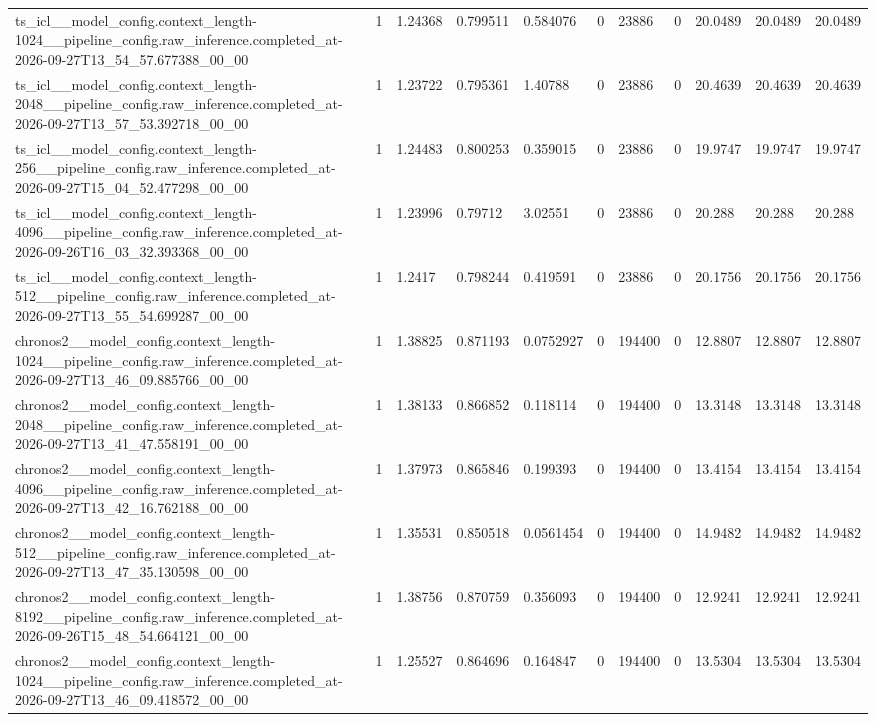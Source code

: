 \begin{tabular}{lllllllllll}
ts\_icl\_\_model\_config.context\_length-1024\_\_pipeline\_config.raw\_inference.completed\_at-2026-09-27T13\_54\_57.677388\_00\_00 & 1 & 1.24368 & 0.799511 & 0.584076 & 0 & 23886 & 0 & 20.0489 & 20.0489 & 20.0489 \\
ts\_icl\_\_model\_config.context\_length-2048\_\_pipeline\_config.raw\_inference.completed\_at-2026-09-27T13\_57\_53.392718\_00\_00 & 1 & 1.23722 & 0.795361 & 1.40788 & 0 & 23886 & 0 & 20.4639 & 20.4639 & 20.4639 \\
ts\_icl\_\_model\_config.context\_length-256\_\_pipeline\_config.raw\_inference.completed\_at-2026-09-27T15\_04\_52.477298\_00\_00 & 1 & 1.24483 & 0.800253 & 0.359015 & 0 & 23886 & 0 & 19.9747 & 19.9747 & 19.9747 \\
ts\_icl\_\_model\_config.context\_length-4096\_\_pipeline\_config.raw\_inference.completed\_at-2026-09-26T16\_03\_32.393368\_00\_00 & 1 & 1.23996 & 0.79712 & 3.02551 & 0 & 23886 & 0 & 20.288 & 20.288 & 20.288 \\
ts\_icl\_\_model\_config.context\_length-512\_\_pipeline\_config.raw\_inference.completed\_at-2026-09-27T13\_55\_54.699287\_00\_00 & 1 & 1.2417 & 0.798244 & 0.419591 & 0 & 23886 & 0 & 20.1756 & 20.1756 & 20.1756 \\
chronos2\_\_model\_config.context\_length-1024\_\_pipeline\_config.raw\_inference.completed\_at-2026-09-27T13\_46\_09.885766\_00\_00 & 1 & 1.38825 & 0.871193 & 0.0752927 & 0 & 194400 & 0 & 12.8807 & 12.8807 & 12.8807 \\
chronos2\_\_model\_config.context\_length-2048\_\_pipeline\_config.raw\_inference.completed\_at-2026-09-27T13\_41\_47.558191\_00\_00 & 1 & 1.38133 & 0.866852 & 0.118114 & 0 & 194400 & 0 & 13.3148 & 13.3148 & 13.3148 \\
chronos2\_\_model\_config.context\_length-4096\_\_pipeline\_config.raw\_inference.completed\_at-2026-09-27T13\_42\_16.762188\_00\_00 & 1 & 1.37973 & 0.865846 & 0.199393 & 0 & 194400 & 0 & 13.4154 & 13.4154 & 13.4154 \\
chronos2\_\_model\_config.context\_length-512\_\_pipeline\_config.raw\_inference.completed\_at-2026-09-27T13\_47\_35.130598\_00\_00 & 1 & 1.35531 & 0.850518 & 0.0561454 & 0 & 194400 & 0 & 14.9482 & 14.9482 & 14.9482 \\
chronos2\_\_model\_config.context\_length-8192\_\_pipeline\_config.raw\_inference.completed\_at-2026-09-26T15\_48\_54.664121\_00\_00 & 1 & 1.38756 & 0.870759 & 0.356093 & 0 & 194400 & 0 & 12.9241 & 12.9241 & 12.9241 \\
chronos2\_\_model\_config.context\_length-1024\_\_pipeline\_config.raw\_inference.completed\_at-2026-09-27T13\_46\_09.418572\_00\_00 & 1 & 1.25527 & 0.864696 & 0.164847 & 0 & 194400 & 0 & 13.5304 & 13.5304 & 13.5304 \\

\end{tabular}
